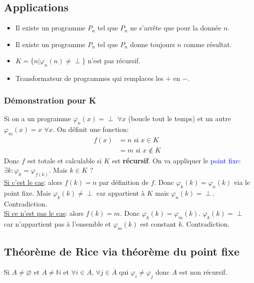 \documentclass{report}
\begin{document}
\subsection{Applications}
\begin{itemize}
\item Il existe un programme $P_n$ tel que $P_n$ ne s'arrête que pour la donnée $n$.
\item Il existe un programme $P_n$ tel que $P_n$ donne toujours $n$ comme résultat.
\item $K = \{n | \varphi_n (n) \neq \perp \}$ n'est pas récursif.
\item Transformateur de programmes qui remplaces les $+$ en $-$.
\end{itemize}

\subsubsection{Démonstration pour K}
Si on a un programme $\varphi_n (x) = \perp$ $\forall x$ (boucle tout le temps) et un autre $\varphi_m (x) = x$ $ \forall x$. On définit une fonction:
\begin{align*}
f(x) &= n \text{ si } x \in K\\
&= m \text{ si } x \notin K
\end{align*}
Donc $f$ est totale et calculable si $K$ est \textbf{récursif}. On va appliquer le \textcolor{blue}{point fixe}: $\exists k: \varphi_k = \varphi_{f(k)}$. Mais $k \in K$ ?\\
\underline{Si c'est le cas}: alors $f(k) = n$ par définition de $f$. Donc $\varphi_k (k) = \varphi_n (k)$ via le point fixe. Mais $\varphi_k (k) \neq \perp$ car appartient à $K$ mais $\varphi_n (k) = \perp$. Contradiction.\\ 
\underline{Si ce n'est pas le cas}: alors $f(k) = m$. Donc $\varphi_k (k) = \varphi_m (k)$. $\varphi_k (k) = \perp$ car n'appartient pas à l'ensemble et $\varphi_m (k)$ est constant $k$. Contradiction.

\subsection{Théorème de Rice via théorème du point fixe}
Si $A \neq \varnothing$ et $A \neq \mathbb{N}$ et $\forall i \in A$, $\forall j \in \overline{A}$ qui $\varphi_i \neq \varphi_j$ donc $A$ est non récursif.
\end{document}
